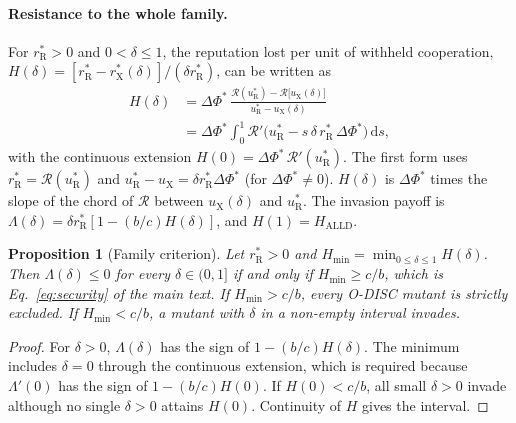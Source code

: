 \documentclass[10pt]{wlscirep}
\newcommand{\Rmap}{\mathscr{R}}            %
\newcommand{\rR}{r_{\mathrm{R}}^{*}}
\newcommand{\uR}{u_{\mathrm{R}}^{*}}
\newcommand{\rX}{r_{\mathrm{X}}^{*}}
\newcommand{\uX}{u_{\mathrm{X}}}
\newcommand{\dPhi}{\Delta\Phi^{*}}
\newcommand{\Hmin}{H_{\min}}
\newcommand{\dd}{\mathrm{d}}
\newcommand{\ALLD}{\mathrm{ALLD}}
\theoremstyle{plain}
\newtheorem{proposition}[lemma]{Proposition}
\theoremstyle{remark}
\begin{document}
\paragraph{Resistance to the whole family.} For $\rR>0$ and $0<\delta\leq1$, the reputation lost per unit of withheld cooperation, $H(\delta)=[\rR-\rX(\delta)]/(\delta\rR)$, can be written as
\begin{equation}
\begin{aligned}
H(\delta)&=\dPhi\,\frac{\Rmap(\uR)-\Rmap\bigl[\uX(\delta)\bigr]}{\uR-\uX(\delta)}\\
&=\dPhi\int_0^1\Rmap'\bigl(\uR-s\,\delta\,\rR\,\dPhi\bigr)\,\dd s,
\end{aligned}
\label{eq:s-H}
\end{equation}
with the continuous extension $H(0)=\dPhi\,\Rmap'(\uR)$. The first form uses $\rR=\Rmap(\uR)$ and $\uR-\uX=\delta\rR\dPhi$ (for $\dPhi\neq0$). $H(\delta)$ is $\dPhi$ times the slope of the chord of $\Rmap$ between $\uX(\delta)$ and $\uR$. The invasion payoff is $\Lambda(\delta)=\delta\rR[1-(b/c)H(\delta)]$, and $H(1)=H_{\ALLD}$.

\begin{proposition}[Family criterion]\label{prop:family}
Let $\rR>0$ and $\Hmin=\min_{0\leq\delta\leq1}H(\delta)$. Then $\Lambda(\delta)\leq0$ for every $\delta\in(0,1]$ if and only if $\Hmin\geq c/b$, which is Eq.~\eqref{eq:security} of the main text. If $\Hmin>c/b$, every O-DISC mutant is strictly excluded. If $\Hmin<c/b$, a mutant with $\delta$ in a non-empty interval invades.
\end{proposition}
\begin{proof}
For $\delta>0$, $\Lambda(\delta)$ has the sign of $1-(b/c)H(\delta)$. The minimum includes $\delta=0$ through the continuous extension, which is required because $\Lambda'(0)$ has the sign of $1-(b/c)H(0)$. If $H(0)<c/b$, all small $\delta>0$ invade although no single $\delta>0$ attains $H(0)$. Continuity of $H$ gives the interval.
\end{proof}
\end{document}
